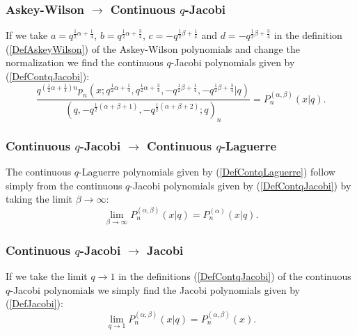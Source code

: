 \documentclass[envcountchap,graybox]{svmono}
\newcounter{rom}
\begin{document}
\subsubsection*{Askey-Wilson $\rightarrow$ Continuous $q$-Jacobi}
If we take $a=q^{\frac{1}{2}\alpha+\frac{1}{4}}$, $b=q^{\frac{1}{2}\alpha+\frac{3}{4}}$,
$c=-q^{\frac{1}{2}\beta+\frac{1}{4}}$ and $d=-q^{\frac{1}{2}\beta+\frac{3}{4}}$ in
the definition (\ref{DefAskeyWilson}) of the Askey-Wilson polynomials and
change the normalization we find the continuous $q$-Jacobi polynomials given
by (\ref{DefContqJacobi}):
$$\frac{q^{(\frac{1}{2}\alpha+\frac{1}{4})n}p_n(x;q^{\frac{1}{2}\alpha+\frac{1}{4}},q^{\frac{1}{2}\alpha+\frac{3}{4}},
-q^{\frac{1}{2}\beta+\frac{1}{4}},-q^{\frac{1}{2}\beta+\frac{3}{4}}|q)}
{(q,-q^{\frac{1}{2}(\alpha+\beta+1)},-q^{\frac{1}{2}(\alpha+\beta+2)};q)_n}
=P_n^{(\alpha,\beta)}(x|q).$$

\subsubsection*{Continuous $q$-Jacobi $\rightarrow$ Continuous $q$-Laguerre}
The continuous $q$-Laguerre polynomials given by (\ref{DefContqLaguerre})
follow simply from the continuous $q$-Jacobi polynomials given by (\ref{DefContqJacobi})
by taking the limit $\beta\rightarrow\infty$:
\begin{equation}
\lim _{\beta\rightarrow\infty} P_n^{(\alpha,\beta)}(x|q)=P_n^{(\alpha)}(x|q).
\end{equation}

\subsubsection*{Continuous $q$-Jacobi $\rightarrow$ Jacobi}
If we take the limit $q\rightarrow 1$ in the definitions (\ref{DefContqJacobi}) of the continuous
$q$-Jacobi polynomials we simply find the Jacobi polynomials given by (\ref{DefJacobi}):
\begin{equation}
\lim_{q\rightarrow 1}P_n^{(\alpha,\beta)}(x|q)=P_n^{(\alpha,\beta)}(x).
\end{equation}
\end{document}
